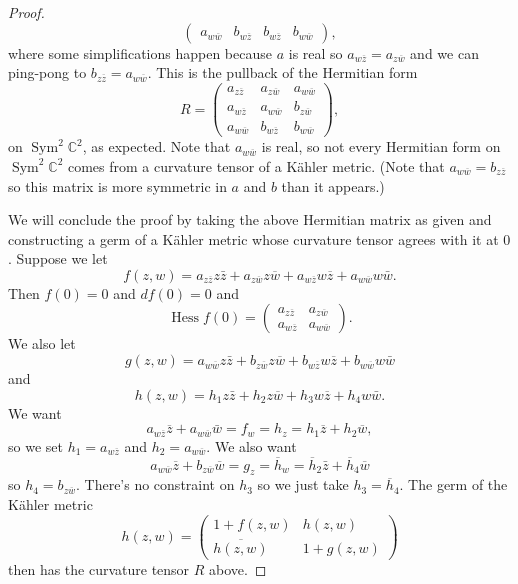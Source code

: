\documentclass[10pt,a4paper]{amsart}
\theoremstyle{definition}
\def\ov#1{\overline{#1}}
\newcommand{\kk}[1]{\mathbb{#1}}
\DeclareMathOperator{\Sym}{Sym}
\begin{document}
\begin{proof}
$$\begin{pmatrix}
a_{w \ov w} & b_{w \ov z} & b_{w \ov z} & b_{w \ov w}
\end{pmatrix},
$$
where some simplifications happen because $a$ is real so $a_{w \ov z} =
a_{z \ov w}$ and we can ping-pong to $b_{z \ov z} = a_{w \ov w}$.
This is the pullback of the Hermitian form
$$
R = \begin{pmatrix}
a_{z \ov z} & a_{z \ov w} & a_{w \ov w}
\\
a_{w \ov z} & a_{w \ov w} & b_{z \ov w}
\\
a_{w \ov w} & b_{w \ov z} & b_{w \ov w}
\end{pmatrix},
$$
on $\Sym^2 \kk C^2$, as expected.
Note that $a_{w \ov w}$ is real, so not every Hermitian form on
$\Sym^2 \kk C^2$ comes from a curvature tensor of a K\"ahler metric.
(Note that $a_{w \ov w} = b_{z \ov z}$ so this matrix is more symmetric in $a$
and $b$ than it appears.)


We will conclude the proof by taking the above Hermitian matrix as given and
constructing a germ of a K\"ahler metric whose curvature tensor agrees with it
at $0$.
Suppose we let
$$
f(z,w)
= a_{z \ov z} z \bar z
+ a_{z \ov w} z \ov w
+ a_{w \ov z} w \ov z
+ a_{w \ov w} w \bar w.
$$
Then $f(0) = 0$ and $df(0) = 0$ and
$$
\operatorname{Hess} f(0)
= \begin{pmatrix}
a_{z \ov z} & a_{z \ov w}
\\
a_{w \ov z} & a_{w \ov w}
\end{pmatrix}.
$$
We also let
$$
g(z,w)
= a_{w \ov w} z \bar z
+ b_{z \ov w} z \ov w
+ b_{w \ov z} w \ov z
+ b_{w \ov w} w \bar w
$$
and
$$
h(z,w)
= h_1 z \bar z
+ h_2 z \ov w
+ h_3 w \ov z
+ h_4 w \bar w.
$$
We want
$$
a_{w \ov z} \ov z + a_{w \ov w} \bar w
= f_w = h_z
= h_1 \ov z + h_2 \ov w,
$$
so we set $h_1 = a_{w \ov z}$ and $h_2 = a_{w \ov w}$.
We also want
$$
a_{w \ov w} \ov z + b_{z \ov w} \ov w
= g_z = \ov h_w
= \ov h_2 \bar z + \ov h_4 \ov w
$$
so $h_4 = b_{z \ov w}$.
There's no constraint on $h_3$ so we just take $h_3 = \ov h_4$.
The germ of the K\"ahler metric
$$
h(z,w)
= \begin{pmatrix}
1 + f(z,w) & h(z,w)
\\
\ov{h(z,w)} & 1 + g(z,w)
\end{pmatrix}
$$
then has the curvature tensor $R$ above.
\end{proof}
\end{document}
